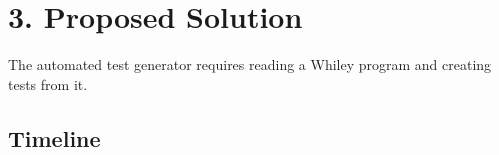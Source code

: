 \documentclass[11pt, a4paper, twoside, openright]{report}
\begin{document}
%
%
%
%

\section*{3. Proposed Solution}

The automated test generator requires reading a Whiley program and creating tests from it.


\subsection*{Timeline}
\end{document}
